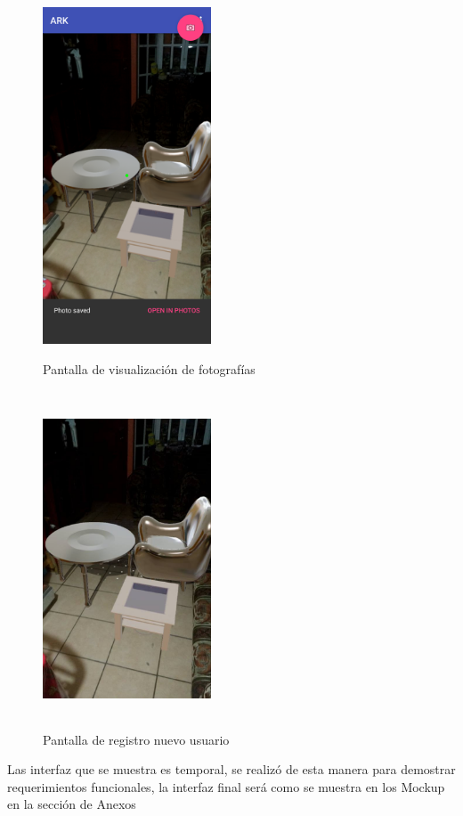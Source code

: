 \begin{figure}[H]
	\begin{minipage}{0.48\textwidth}
		\centering
		\includegraphics[width=5cm,height=10cm]{imagenes/iteraciones/save1.png}
		\caption{Pantalla de visualización de fotografías}
		\label{fig:save}
	\end{minipage}\hfill
	\begin{minipage}{0.48\textwidth}
		\centering
		\includegraphics[width=5cm,height=10cm]{imagenes/iteraciones/foto.jpg}
		\caption{Pantalla de registro nuevo usuario}
		\label{fig:foto}
	\end{minipage}\hfill
\end{figure}
Las interfaz que se muestra es temporal, se realizó de esta manera para demostrar requerimientos funcionales, la interfaz final será como se muestra en los Mockup en la sección de Anexos 